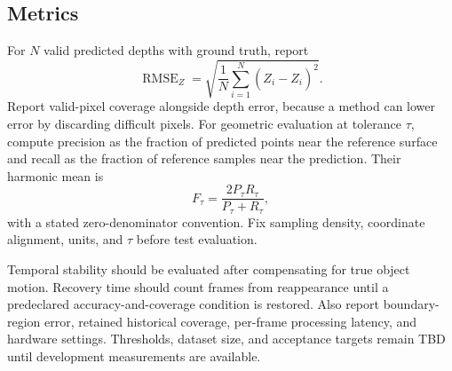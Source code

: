 \subsection{Metrics}
For $N$ valid predicted depths with ground truth, report
\begin{equation}
\operatorname{RMSE}_Z=\sqrt{\frac{1}{N}\sum_{i=1}^{N}(Z_i-\widehat Z_i)^2}.
\end{equation}
Report valid-pixel coverage alongside depth error, because a method can lower error by discarding difficult pixels. For geometric evaluation at tolerance $\tau$, compute precision as the fraction of predicted points near the reference surface and recall as the fraction of reference samples near the prediction. Their harmonic mean is
\begin{equation}
F_{\tau}=\frac{2P_{\tau}R_{\tau}}{P_{\tau}+R_{\tau}},
\end{equation}
with a stated zero-denominator convention. Fix sampling density, coordinate alignment, units, and $\tau$ before test evaluation.

Temporal stability should be evaluated after compensating for true object motion. Recovery time should count frames from reappearance until a predeclared accuracy-and-coverage condition is restored. Also report boundary-region error, retained historical coverage, per-frame processing latency, and hardware settings. Thresholds, dataset size, and acceptance targets remain TBD until development measurements are available.
